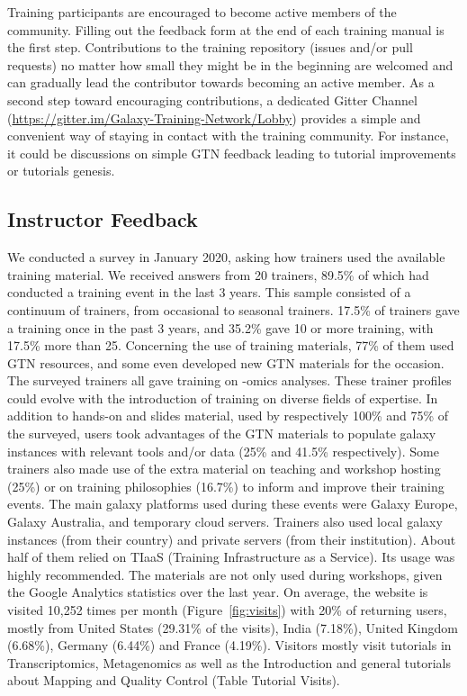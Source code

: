 \documentclass[10pt,letterpaper]{article}
\begin{document}
Training participants are encouraged to become active members of the community.
Filling out the feedback form at the end of each training manual is the first step. Contributions to the training repository (issues and/or pull requests) no matter how small they might be in the beginning are welcomed and can gradually lead the contributor towards becoming an active member.
As a second step toward encouraging contributions, a dedicated Gitter Channel (\url{https://gitter.im/Galaxy-Training-Network/Lobby}) provides a simple and convenient way of staying in contact with the training community.
For instance, it could be discussions on simple GTN feedback leading to tutorial improvements or tutorials genesis.

\subsection*{Instructor Feedback}
We conducted a survey in January 2020, asking how trainers used the available training material. We received answers from 20 trainers, 89.5\% of which had conducted a training event in the last 3 years.
This sample consisted of a continuum of trainers, from occasional to seasonal trainers. 17.5\% of trainers gave a training once in the past 3 years, and 35.2\% gave 10 or more training, with 17.5\% more than 25.
Concerning the use of training materials, 77\% of them used GTN resources, and some even developed new GTN materials for the occasion. The surveyed trainers all gave training on -omics analyses.
These trainer profiles could evolve with the introduction of training on diverse fields of expertise. In addition to hands-on and slides material, used by respectively 100\% and 75\% of the surveyed, users took advantages of the GTN materials to populate galaxy instances with relevant tools and/or data (25\% and 41.5\% respectively).
Some trainers also made use of the extra material on teaching and workshop hosting (25\%) or on training philosophies (16.7\%) to inform and improve their training events.
The main galaxy platforms used during these events were Galaxy Europe, Galaxy  Australia, and temporary cloud servers. Trainers also used local galaxy instances (from their country) and  private servers (from their institution).
About half of them relied on TIaaS (Training Infrastructure as a Service). Its usage was highly recommended.
The materials are not only used during workshops, given the Google Analytics statistics over the last year.
On average, the website is visited 10,252 times per month (Figure~\ref{fig:visits}) with 20\% of returning users, mostly from United States (29.31\% of the visits), India (7.18\%), United Kingdom (6.68\%), Germany (6.44\%) and France (4.19\%). Visitors mostly visit tutorials in Transcriptomics, Metagenomics as well as the Introduction and general tutorials about Mapping and Quality Control (Table Tutorial Visits).
\end{document}
